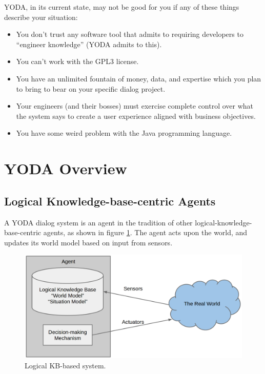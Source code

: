 \documentclass[titlepage]{article}
\begin{document}
\noindent
YODA, in its current state, may not be good for you if any of these things describe your situation:
\begin{itemize}
  \item You don't trust any software tool that admits to requiring developers to ``engineer knowledge'' (YODA admits to this).
  \item You can't work with the GPL3 license.
  \item You have an unlimited fountain of money, data, and expertise which you plan to bring to bear on your specific dialog project.
  \item Your engineers (and their bosses) must exercise complete control over what the system says to create a user experience aligned with business objectives.
  \item You have some weird problem with the Java programming language.
\end{itemize}




\section{YODA Overview}

\subsection{Logical Knowledge-base-centric Agents}

A YODA dialog system is an agent in the tradition of other logical-knowledge-base-centric agents, as shown in figure \ref{logical-kb-agent}.
The agent acts upon the world, and updates its world model based on input from sensors.

\begin{figure}[h!]
\centering
\includegraphics[width=.75\textwidth]{logical_kb_agent}
\caption{Logical KB-based system.}
\label{logical-kb-agent}
\end{figure}
\end{document}
